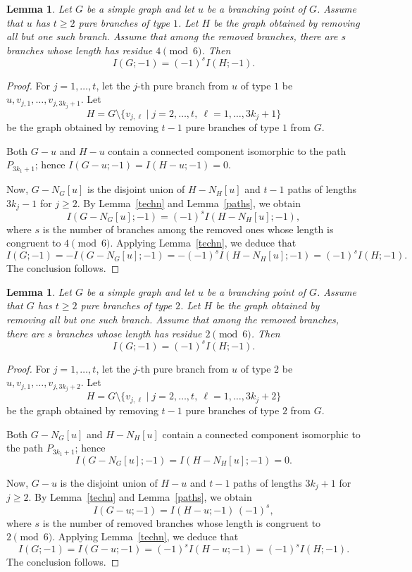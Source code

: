 \documentclass[12pt,amscd]{amsart}
\newtheorem{lem}[thm]{Lemma}
\theoremstyle{definition}
\numberwithin{equation}{section}
\begin{document}
\begin{lem}\label{lem_pure_type_1}
Let \( G \) be a simple graph and let \( u \) be a branching point of \( G \). Assume that \( u \) has \( t \ge 2 \) pure branches of type \( 1 \). Let \( H \) be the graph obtained by removing all but one such branch. Assume that among the removed branches, there are \( s \) branches whose length has residue \( 4 \pmod{6} \). Then
\[
I(G;-1) = (-1)^s I(H;-1).
\]
\end{lem}
\begin{proof}
For \( j = 1, \ldots, t \), let the \( j \)-th pure branch from \( u \) of type \( 1 \) be
\( u, v_{j,1}, \ldots, v_{j,3k_j+1} \). Let
\[
H = G \setminus \{ v_{j,\ell} \mid j = 2, \ldots, t,\ \ell = 1, \ldots, 3k_j+1 \}
\]
be the graph obtained by removing \( t-1 \) pure branches of type \( 1 \) from \( G \).

Both \( G - u \) and \( H - u \) contain a connected component isomorphic to the path \( P_{3k_1+1} \); hence \( I(G-u;-1) = I(H-u;-1) = 0 \).

Now, \( G - N_G[u] \) is the disjoint union of \( H - N_H[u] \) and \( t-1 \) paths of lengths \( 3k_j - 1 \) for \( j \ge 2 \). By Lemma~\ref{techn} and Lemma~\ref{paths}, we obtain
\[
I(G-N_G[u];-1) = (-1)^s I(H-N_H[u];-1),
\]
where \( s \) is the number of branches among the removed ones whose length is congruent to \( 4 \pmod{6} \). Applying Lemma~\ref{techn}, we deduce that
\[
I(G;-1)
= - I(G-N_G[u];-1)
= - (-1)^s I(H-N_H[u];-1) 
= (-1)^s I(H;-1).
\]
The conclusion follows.
\end{proof}


\begin{lem}\label{lem_pure_type_2}
Let \( G \) be a simple graph and let \( u \) be a branching point of \( G \). Assume that \( G \) has \( t \ge 2 \) pure branches of type \( 2 \). Let \( H \) be the graph obtained by removing all but one such branch. Assume that among the removed branches, there are \( s \) branches whose length has residue \( 2 \pmod{6} \). Then
\[
I(G;-1) = (-1)^s I(H;-1).
\]
\end{lem}

\begin{proof}
For \( j = 1, \ldots, t \), let the \( j \)-th pure branch from \( u \) of type \( 2 \) be
\( u, v_{j,1}, \ldots, v_{j,3k_j+2} \).
Let
\[
H = G \setminus \{ v_{j,\ell} \mid j = 2, \ldots, t,\ \ell = 1, \ldots, 3k_j+2 \}
\]
be the graph obtained by removing \( t-1 \) pure branches of type \( 2 \) from \( G \).

Both \( G - N_G[u] \) and \( H - N_H[u] \) contain a connected component isomorphic to the path \( P_{3k_1+1} \); hence
\[
I(G-N_G[u];-1) = I(H-N_H[u];-1) = 0.
\]

Now, \( G - u \) is the disjoint union of \( H - u \) and \( t-1 \) paths of lengths \( 3k_j+1 \) for \( j \ge 2 \). By Lemma~\ref{techn} and Lemma~\ref{paths}, we obtain
\[
I(G-u;-1) = I(H-u;-1)\,(-1)^s,
\]
where \( s \) is the number of removed branches whose length is congruent to \( 2 \pmod{6} \). Applying Lemma~\ref{techn}, we deduce that
\[
I(G;-1)
= I(G-u;-1)
= (-1)^s I(H-u;-1)
= (-1)^s I(H;-1).
\]
The conclusion follows.
\end{proof}
\end{document}
